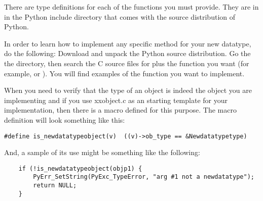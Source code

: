 There are type definitions for each of the functions you must
provide.  They are in  in the Python include
directory that comes with the source distribution of Python.

In order to learn how to implement any specific method for your new
datatype, do the following: Download and unpack the Python source
distribution.  Go the the  directory, then search the
C source files for  plus the function you want (for
example,  or ).  You will find
examples of the function you want to implement.

When you need to verify that the type of an object is indeed the
object you are implementing and if you use xxobject.c as an starting
template for your implementation, then there is a macro defined for
this purpose. The macro definition will look something like this:

\begin{verbatim}
#define is_newdatatypeobject(v)  ((v)->ob_type == &Newdatatypetype)
\end{verbatim}

And, a sample of its use might be something like the following:

\begin{verbatim}
    if (!is_newdatatypeobject(objp1) {
        PyErr_SetString(PyExc_TypeError, "arg #1 not a newdatatype");
        return NULL;
    }
\end{verbatim}
